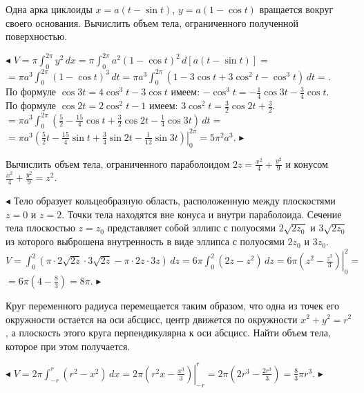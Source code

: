 \documentclass[a5paper,10pt]{article}
\begin{document}
\medskip
{} Одна арка циклоиды $x=a(t-\sin t)$, $y=a(1-\cos t)$
вращается вокруг своего основания. Вычислить объем тела,
ограниченного полученной поверхностью.

\medskip
\noindent $\blacktriangleleft$ $\displaystyle V=\pi\int_0^{2\pi}y^2\,dx=
\pi\int_0^{2\pi}a^2(1-\cos t)^2\,d[a(t-\sin t)]=$\\
$\displaystyle =\pi a^3\int_0^{2\pi}(1-\cos t)^3\,dt=
\pi a^3\int_0^{2\pi}(1-3\cos t+3\cos^2t-\cos^3t)\,dt=$.\\
По формуле $\cos3t=4\cos^3t-3\cos t$ имеем:
$\displaystyle -\cos^3t=-\frac14\cos3t-\frac34\cos t$.\\
По формуле $\cos2t=2\cos^2t-1$ имеем:
$\displaystyle 3\cos^2t=\frac32\cos2t+\frac32$.\\
$\displaystyle =\pi a^3\int_0^{2\pi}
\left(\frac52-\frac{15}{4}\cos t+\frac32\cos2t-\frac14\cos3t \right)\,dt=$\\
$\displaystyle =\pi a^3\left.\left(\frac52t-\frac{15}{4}\sin t+\frac34\sin2t-
\frac{1}{12}\sin3t \right)\right|_0^{2\pi}=5\pi^2a^3$. $\blacktriangleright$

\medskip
{} Вычислить объем тела, ограниченного параболоидом
$\displaystyle 2z=\frac{x^2}{4}+\frac{y^2}{9}$ и конусом
$\displaystyle \frac{x^2}{4}+\frac{y^2}{9}=z^2$.

\medskip
\noindent $\blacktriangleleft$ Тело образует кольцеобразную область,
расположенную между плоскостями $z=0$ и $z=2$. Точки тела находятся
вне конуса и внутри параболоида. Сечение тела плоскостью $z=z_0$
представляет собой эллипс с полуосями $2\sqrt{2z_0}$ и $3\sqrt{2z_0}$ из которого
выброшена внутренность в виде эллипса с полуосями  $2z_0$ и $3z_0$.
$\displaystyle V=\int_0^2(\pi\cdot2\sqrt{2z}\cdot3\sqrt{2z}-\pi\cdot2z\cdot3z)\,dz=
6\pi\int_0^2(2z-z^2)\,dz=
6\pi\left.\left(z^2-\frac{z^3}{3}\right)\right|_0^2=$\\
$\displaystyle =6\pi\left(4-\frac{8}{3}\right)=8\pi$. $\blacktriangleright$

\medskip
{} Круг переменного радиуса перемещается таким образом,
что одна из точек его окружности остается на оси абсцисс, центр
движется по окружности $x^2+y^2=r^2$, а плоскость этого круга
перпендикулярна к оси абсцисс. Найти объем тела, которое при этом получается.

\medskip
\noindent $\blacktriangleleft$ $\displaystyle V=2\pi\int_{-r}^{r}(r^2-x^2)\,dx=
2\pi\left.\left(r^2x-\frac{x^3}{3}\right)\right |_{-r}^{r}=
2\pi\left(2r^3-\frac{2r^3}{3}\right)=\frac83\pi r^3$.
$\blacktriangleright$
\end{document}
